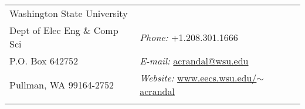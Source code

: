 \begin{center}
{}
\end{center}

\vspace{.6cm}

\begin{tabular}{@{}p{3in}p{3in}}
Washington State University  & \\
Dept of Elec Eng \& Comp Sci &  {\it Phone:} +1.208.301.1666 \\
P.O. Box 642752    &  {\it E-mail:}  \href{mailto:acrandal@wsu.edu}{acrandal@wsu.edu}\\
Pullman, WA 99164-2752 & {\it Website:} \href{http://www.eecs.wsu.edu/~acrandal}{www.eecs.wsu.edu/$\sim$acrandal} \\
\\
\hline \hline
\end{tabular}
